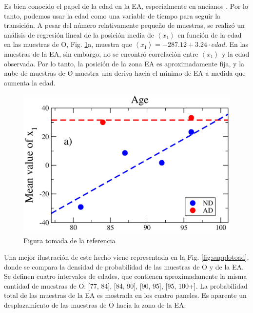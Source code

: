Es bien conocido el papel de la edad en la EA, especialmente en ancianos \cite{alz2019}. Por lo tanto, podemos usar la edad como una variable de tiempo para seguir la transición. A pesar del número relativamente pequeño de muestras, se realizó un análisis de regresión lineal de la posición media de $\left\langle x_1 \right\rangle$ en función de la edad en las muestras de O, Fig. \ref{fig:otoad}a, muestra que $\left\langle x_1 \right\rangle = -287.12 + 3.24 \cdot edad$. En las muestras de la EA, sin embargo, no se encontró correlación entre $\left\langle x_1 \right\rangle$ y la edad observada. Por lo tanto, la posición de la zona EA es aproximadamente fija, y la nube de muestras de O muestra una deriva hacia el mínimo de EA a medida que aumenta la edad.

\begin{figure}[!htb]
	\centering
	\includegraphics[width=0.7\linewidth]{figures/O_to_AD_1.png}
	\caption{Figura tomada de la referencia \cite{Gonzalez_2021}}
	\label{fig:otoad}
\end{figure}

Una mejor ilustración de este hecho viene representada en la Fig. \ref{fig:supplotoad}, donde se compara la densidad de probabilidad de las muestras de O y de la EA. Se definen cuatro intervalos de edades, que contienen aproximadamente la misma cantidad de muestras de O: [77, 84], [84, 90], [90, 95], [95, 100+]. La probabilidad total de las muestras de la EA es mostrada en los cuatro paneles. Es aparente un desplazamiento de las muestras de O hacia la zona de la EA.


